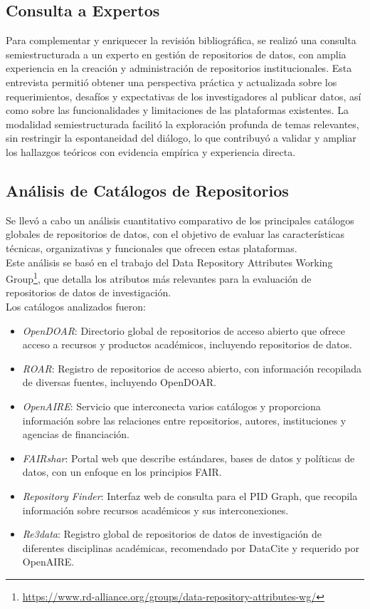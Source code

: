 \documentclass{article}
\begin{document}
\subsection{Consulta a Expertos}

Para complementar y enriquecer la revisión bibliográfica, se realizó una consulta semiestructurada a un experto en gestión de repositorios de datos, con amplia experiencia en la creación y administración de repositorios institucionales. Esta entrevista permitió obtener una perspectiva práctica y actualizada sobre los requerimientos, desafíos y expectativas de los investigadores al publicar datos, así como sobre las funcionalidades y limitaciones de las plataformas existentes.
La modalidad semiestructurada facilitó la exploración profunda de temas relevantes, sin restringir la espontaneidad del diálogo, lo que contribuyó a validar y ampliar los hallazgos teóricos con evidencia empírica y experiencia directa.\\

\subsection{Análisis de Catálogos de Repositorios}

Se llevó a cabo un análisis cuantitativo comparativo de los principales catálogos globales de repositorios de datos, con el objetivo de evaluar las características técnicas, organizativas y funcionales que ofrecen estas plataformas.\\

Este análisis se basó en el trabajo del Data Repository Attributes Working Group\footnote{\url{https://www.rd-alliance.org/groups/data-repository-attributes-wg/}}, que detalla los atributos más relevantes para la evaluación de repositorios de datos de investigación.\\

Los catálogos analizados fueron:
\begin{itemize}
    \item \emph{OpenDOAR}: Directorio global de repositorios de acceso abierto que ofrece acceso a recursos y productos académicos, incluyendo repositorios de datos.
    \item \emph{ROAR}: Registro de repositorios de acceso abierto, con información recopilada de diversas fuentes, incluyendo OpenDOAR.
    \item \emph{OpenAIRE}: Servicio que interconecta varios catálogos y proporciona información sobre las relaciones entre repositorios, autores, instituciones y agencias de financiación.
    \item \emph{FAIRshar}: Portal web que describe estándares, bases de datos y políticas de datos, con un enfoque en los principios FAIR.
    \item \emph{Repository Finder}: Interfaz web de consulta para el PID Graph, que recopila información sobre recursos académicos y sus interconexiones.
    \item \emph{Re3data}: Registro global de repositorios de datos de investigación de diferentes disciplinas académicas, recomendado por DataCite y requerido por OpenAIRE.
\end{itemize}
\end{document}
